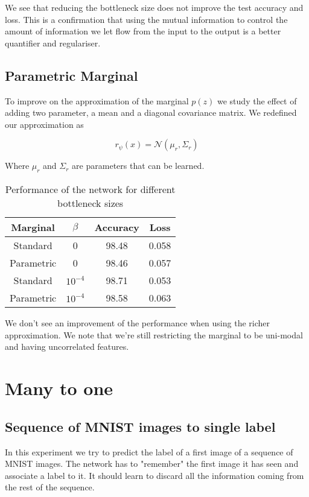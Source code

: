 \documentclass[11pt,oneside,openright]{report}
\begin{document}
We see that reducing the bottleneck size does not improve the test accuracy and loss. This is a confirmation that using the mutual information to control the amount of information we let flow from the input to the output is a better quantifier and regulariser.

\subsection{Parametric Marginal}
To improve on the approximation of the marginal $p(z)$ we study the effect of adding two parameter, a mean and a diagonal covariance matrix. We redefined our approximation as

$$r_\psi(x) = \mathcal{N}(\mu_r, \Sigma_r)$$ 

Where $\mu_r$ and $\Sigma_r$ are parameters that can be learned. 

\begin {table}[H]
\begin{center}
\begin{tabular}{ c  c| c c }
 Marginal & $\beta$ & Accuracy & Loss \\
 \hline
Standard &  0 & 98.48 & 0.058 \\
Parametric & 0 & 98.46 & 0.057 \\
Standard &  $10^{-4}$ & 98.71 & 0.053 \\
Parametric & $10^{-4}$ & 98.58 & 0.063 \\
\end{tabular}
\end{center}
\caption{Performance of the network for different bottleneck sizes}
\end {table}

We don't see an improvement of the performance when using the richer approximation. We note that we're still restricting the marginal to be uni-modal and having uncorrelated features.

\section{Many to one}
\subsection{Sequence of MNIST images to single label}
In this experiment we try to predict the label of a first image of a sequence of MNIST images. The network has to "remember" the first image it has seen and associate a label to it. It should learn to discard all the information coming from the rest of the sequence.
\end{document}
